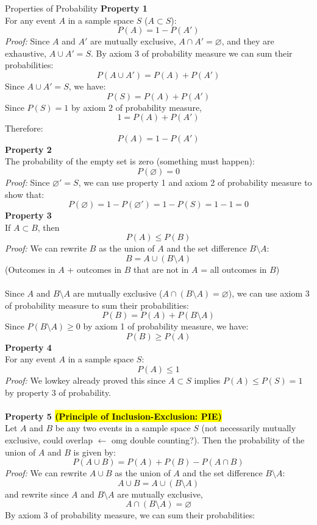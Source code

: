 ﻿\documentclass[12pt]{article}
\begin{document}
\begin{theorem}{Properties of Probability}
\textbf{Property 1}\\
For any event $A$ in a sample space $S$ ($A\subset S$):
\[P(A) = 1 - P(A')\]
\textit{Proof:} Since $A$ and $A'$ are mutually exclusive, $A \cap A' = \varnothing$, and they are exhaustive, $A \cup A' = S$. By axiom 3 of probability measure we can sum their probabilities:
\[P(A \cup A') = P(A) + P(A')\]
Since $A \cup A' = S$, we have:
\[P(S) = P(A) + P(A')\]
Since $P(S) = 1$ by axiom 2 of probability measure,
\[1 = P(A) + P(A')\]
Therefore:
\[P(A) = 1 - P(A')\]
\textbf{Property 2}\\
The probability of the empty set is zero (something must happen):
\[P(\varnothing) = 0\]
\textit{Proof:} Since $\varnothing' = S$, we can use property 1 and axiom 2 of probability measure to show that:
\[P(\varnothing) = 1 - P(\varnothing') = 1 - P(S) = 1 - 1 = 0\]
\textbf{Property 3}\\
If $A\subset B$, then
\[P(A) \leq P(B)\]
\textit{Proof:} We can rewrite $B$ as the union of $A$ and the set difference $B \setminus A$:
\[B = A \cup (B \setminus A)\]
(Outcomes in $A$ + outcomes in $B$ that are not in $A$ = all outcomes in $B$)\\\\
Since $A$ and $B \setminus A$ are mutually exclusive ($A \cap (B \setminus A ) = \varnothing$), we can use axiom 3 of probability measure to sum their probabilities:
\[P(B) = P(A) + P(B \setminus A)\]
Since $P(B \setminus A) \geq 0$ by axiom 1 of probability measure, we have:
\[P(B) \geq P(A)\]
\textbf{Property 4}\\
For any event $A$ in a sample space $S$:
\[P(A) \leq 1\]
\textit{Proof:} We lowkey already proved this since $A\subset S$ implies $P(A)\leq P(S)=1$ by property 3 of probability.\\\\
\textbf{Property 5 \hl{(Principle of Inclusion-Exclusion: PIE)}}\\
Let $A$ and $B$ be any two events in a sample space $S$ (not necessarily mutually exclusive, could overlap $\leftarrow$ omg double counting?). Then the probability of the union of $A$ and $B$ is given by:
\[P(A \cup B) = P(A) + P(B) - P(A \cap B)\]
\textit{Proof:} We can rewrite $A \cup B$ as the union of $A$ and the set difference $B \setminus A$:
\[A \cup B = A \cup (B \setminus A)\]
and rewrite since $A$ and $B \setminus A$ are mutually exclusive,
\[A\cap(B\setminus A) = \varnothing\]
By axiom 3 of probability measure, we can sum their probabilities:

\end{theorem}
\end{document}
